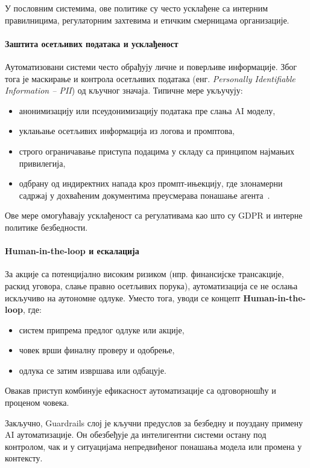 У пословним системима, ове политике су често усклађене са интерним правилницима,
регулаторним захтевима и етичким смерницама организације.

\paragraph{Заштита осетљивих података и усклађеност}

Аутоматизовани системи често обрађују личне и поверљиве информације.
Због тога је маскирање и контрола осетљивих података (енг. \textit{Personally Identifiable Information -- PII})
од кључног значаја. Типичне мере укључују:
\begin{itemize}
    \item анонимизацију или псеудонимизацију података пре слања AI моделу,
    \item уклањање осетљивих информација из логова и промптова,
    \item строго ограничавање приступа подацима у складу са принципом најмањих привилегија,
    \item одбрану од индиректних напада кроз промпт-ињекцију, где злонамерни садржај у дохваћеним документима преусмерава понашање агента~\cite{greshake2023injection}.
\end{itemize}

Ове мере омогућавају усклађеност са регулативама као што су GDPR и интерне политике безбедности.

\paragraph{Human-in-the-loop и ескалација}

За акције са потенцијално високим ризиком (нпр. финансијске трансакције, раскид уговора,
слање правно осетљивих порука), аутоматизација се не ослања искључиво на аутономне одлуке.
Уместо тога, уводи се концепт \textbf{Human-in-the-loop}, где:
\begin{itemize}
    \item систем припрема предлог одлуке или акције,
    \item човек врши финалну проверу и одобрење,
    \item одлука се затим извршава или одбацује.
\end{itemize}

Овакав приступ комбинује ефикасност аутоматизације са одговорношћу и проценом човека.

\noindent
Закључно, Guardrails слој је кључни предуслов за безбедну и поуздану примену AI аутоматизације.
Он обезбеђује да интелигентни системи остану под контролом, чак и у ситуацијама непредвиђеног
понашања модела или промена у контексту.

